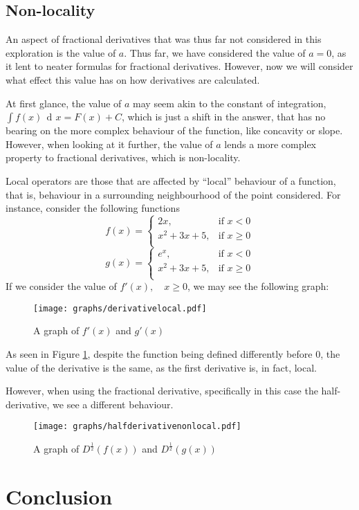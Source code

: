 \documentclass{article}
\def\graphscale{0.7}
\DeclareMathOperator{\di}{\,d\!}
\begin{document}
\subsection{Non-locality} \label{nonlocality}

An aspect of fractional derivatives that was thus far not considered in this
exploration is the value of $a$. Thus far, we have considered the value of
$a=0$, as it lent to neater formulas for fractional derivatives. However, now
we will consider what effect this value has on how derivatives are calculated.

At first glance, the value of $a$ may seem akin to the constant of integration,
$\int f(x) \di x = F(x) + C$, which is just a shift in the answer, that has no
bearing on the more complex behaviour of the function, like concavity or
slope. However, when looking at it further, the value of $a$ lends a more
complex property to fractional derivatives, which is non-locality.

Local operators are those that are affected by ``local'' behaviour of a
function, that is, behaviour in a surrounding neighbourhood of the point
considered. For instance, consider the following functions
$$
	f(x) =
	\begin{cases}
		2x, &\text{if } x < 0 \\

		x^2 + 3x + 5, &\text{if } x \geq 0 \\
	\end{cases}
$$
$$
	g(x) =
	\begin{cases}
		e^x, &\text{if } x < 0 \\

		x^2 + 3x + 5, &\text{if } x \geq 0 \\
	\end{cases}
$$
If we consider the value of $f'(x), \quad x \geq 0$, we may see the following graph:

\begin{figure}[H]
\centering
\texttt{[image: graphs/derivativelocal.pdf]}
\caption{A graph of $f'(x)$ and $g'(x)$} \label{firstderivativelocal}
\end{figure}

As seen in Figure \ref{firstderivativelocal}, despite the function being
defined differently before $0$, the value of the derivative is the same, as the
first derivative is, in fact, local.

However, when using the fractional derivative, specifically in this case the
half-derivative, we see a different behaviour.

\begin{figure}[H]
\centering
\texttt{[image: graphs/halfderivativenonlocal.pdf]}
\caption{A graph of $D^\frac{1}{2}(f(x))$ and $D^\frac{1}{2} (g(x))$} \label{halfderivativenonlocal}
\end{figure}

\section{Conclusion}

\pagebreak

\printbibliography
\end{document}
